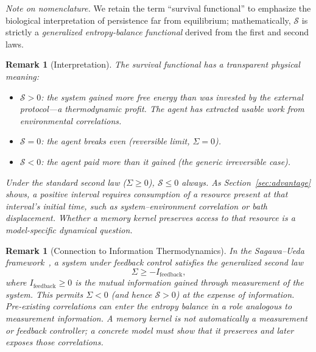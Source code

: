 \documentclass[12pt]{article}
\newtheorem{remark}[theorem]{Remark}
\begin{document}
\noindent\textit{Note on nomenclature.}
We retain the term ``survival functional'' to emphasize
the biological interpretation of persistence far from
equilibrium; mathematically, $\mathcal{S}$ is strictly a
\emph{generalized entropy-balance functional} derived from
the first and second laws.

\begin{remark}[Interpretation]
\label{rem:survival_interp}
The survival functional has a transparent physical meaning:
\begin{itemize}
\item $\mathcal{S} > 0$: the system gained more free energy than
  was invested by the external protocol---a \emph{thermodynamic
  profit}. The agent has extracted usable work from environmental
  correlations.
\item $\mathcal{S} = 0$: the agent breaks even (reversible limit,
  $\Sigma = 0$).
\item $\mathcal{S} < 0$: the agent paid more than it gained
  (the generic irreversible case).
\end{itemize}
Under the standard second law ($\Sigma \geq 0$),
$\mathcal{S} \leq 0$ always.
As Section~\ref{sec:advantage} shows, a positive interval requires
consumption of a resource present at that interval's initial time,
such as system--environment correlation or bath displacement.
Whether a memory kernel preserves access to that resource is a
model-specific dynamical question.
\end{remark}

\begin{remark}[Connection to Information Thermodynamics]
\label{rem:connection_SU}
In the Sagawa--Ueda framework~\cite{SagawaUeda2010,SagawaUeda2012},
a system under feedback control satisfies the generalized second law
\begin{equation}
\label{eq:sagawa_ueda}
\Sigma \geq -I_{\mathrm{feedback}},
\end{equation}
where $I_{\mathrm{feedback}} \geq 0$ is the mutual information
gained through measurement of the system.
This permits $\Sigma < 0$ (and hence $\mathcal{S} > 0$) at
the expense of information.
Pre-existing correlations can enter the entropy balance in a role
analogous to measurement information.  A memory kernel is not
automatically a measurement or feedback controller; a concrete model
must show that it preserves and later exposes those correlations.
\end{remark}

\end{document}
